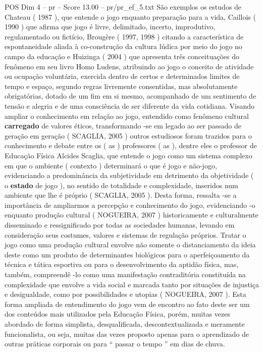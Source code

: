 \begin{textsample}{POS Dim 4 – pr – Score 13.00 – pr/pr\_ef\_5.txt}
São exemplos os estudos de Chateau ( 1987 ), que entende o jogo enquanto preparação para a vida, Caillois ( 1990 ) que afirma que jogo é livre, delimitado, incerto, improdutivo, regulamentado ou fictício, Brougère ( 1997, 1998 ) citando a característica de espontaneidade aliada à co-construção da cultura lúdica por meio do jogo no campo da educação e Huizinga ( 2004 ) que apresenta três conceituações do fenômeno em seu livro Homo Ludens, atribuindo ao jogo o conceito de atividade ou ocupação voluntária, exercida dentro de certos e determinados limites de tempo e espaço, segundo regras livremente consentidas, mas absolutamente obrigatórias, dotado de um fim em si mesmo, acompanhado de um sentimento de tensão e alegria e de uma consciência de ser diferente da vida cotidiana.
Visando ampliar o conhecimento em relação ao jogo, entendido como fenômeno cultural \textbf{carregado} de valores éticos, transformando -se em legado ao ser passado de geração em geração ( SCAGLIA, 2005 ) outros estudiosos foram trazidos para o conhecimento e debate entre os ( as ) professores ( as ), dentre eles o professor de Educação Física Alcides Scaglia, que entende o jogo como um sistema complexo em que o ambiente ( contexto ) determinará o que é jogo e não-jogo, evidenciando a predominância da subjetividade em detrimento da objetividade ( o \textbf{estado} de jogo ), no sentido de totalidade e complexidade, inseridos num ambiente que lhe é próprio ( SCAGLIA, 2005 ).
Desta forma, ressalta -se a importância de ampliarmos a percepção e conhecimento do jogo, evidenciando -o enquanto produção cultural ( NOGUEIRA, 2007 ) historicamente e culturalmente disseminado e ressignificado por todas as sociedades humanas, levando em consideração seus costumes, valores e sistemas de regulação próprios.
Tratar o jogo como uma produção cultural envolve não somente o distanciamento da ideia deste como um produto de determinantes biológicos para o aperfeiçoamento da técnica e tática esportiva ou para o desenvolvimento da aptidão física, mas, também, compreendê -lo como uma manifestação contraditória constituída na complexidade que envolve a vida social e marcada tanto por situações de injustiça e desigualdade, como por possibilidades e utopias ( NOGUEIRA, 2007 ).
Esta forma ampliada de entendimento do jogo vem de encontro ao fato deste ser um dos conteúdos mais utilizados pela Educação Física, porém, muitas vezes abordado de forma simplista, desqualificada, descontextualizada e meramente funcionalista, ou seja, muitas das vezes proposto apenas para o aprendizado de outras práticas corporais ou para “ passar o tempo ” em dias de chuva.

\end{textsample}

